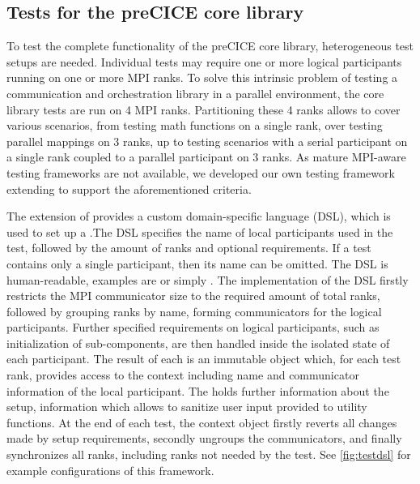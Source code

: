 \subsection{Tests for the preCICE core library}
\label{ssec:unit_and_integration_tests_preCICE}

To test the complete functionality of the preCICE core library, heterogeneous test setups are needed.
Individual tests may require one or more logical participants running on one or more MPI ranks. 
To solve this intrinsic problem of testing a communication and orchestration library in a parallel environment, the core library tests are run on 4 MPI ranks.
Partitioning these 4 ranks allows to cover various scenarios, from testing math functions on a single rank, over testing parallel mappings on 3 ranks, up to testing scenarios with a serial participant on a single rank coupled to a parallel participant on 3 ranks.
As mature MPI-aware testing frameworks are not available, we developed our own testing framework extending  to support the aforementioned criteria.

The extension of  provides a custom domain-specific language (DSL), which is used to set up a .The DSL specifies the name of local participants used in the test, followed by the amount of ranks and optional requirements.
If a test contains only a single participant, then its name can be omitted.
The DSL is human-readable, examples are  or simply .
The implementation of the DSL firstly restricts the MPI communicator size to the required amount of total ranks, followed by grouping ranks by name, forming communicators for the logical participants.
Further specified requirements on logical participants, such as initialization of sub-components, are then handled inside the isolated state of each participant.
The result of each  is an immutable object which, for each test rank, provides access to the context including name and communicator information of the local participant.
The  holds further information about the setup, information which allows to sanitize user input provided to utility functions.
At the end of each test, the context object firstly reverts all changes made by setup requirements, secondly ungroups the communicators, and finally synchronizes all ranks, including ranks not needed by the test.
See \autoref{fig:testdsl} for example configurations of this framework.


